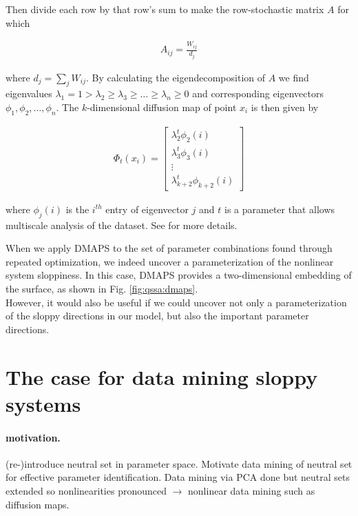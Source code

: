 \documentclass{article}
\begin{document}
Then divide each row by that row's sum to make the row-stochastic
matrix $A$ for which

\begin{align*}
  A_{ij} = \frac{W_{ij}}{d_j}
\end{align*}

where $d_j = \sum_j W_{ij}$. By calculating the eigendecomposition of
$A$ we find eigenvalues
$\lambda_1 = 1 > \lambda_2 \ge \lambda_3 \ge \hdots \ge \lambda_n \ge
0$ and corresponding eigenvectors $\phi_1, \phi_2, \hdots,
\phi_n$. The $k$-dimensional diffusion map of point $x_i$ is then
given by

\begin{align*}
  \Phi_t (x_i) = \begin{bmatrix} \lambda_2^t \phi_2(i) \\ \lambda_3^t
    \phi_3(i) \\ \vdots \\ \lambda_{k+2}^t \phi_{k+2}(i) \end{bmatrix}
\end{align*}

where $\phi_j(i)$ is the $i^{th}$ entry of eigenvector $j$ and $t$ is
a parameter that allows multiscale analysis of the dataset. See
\cite{dmaps} \cite{nadler} for more details.


When we apply DMAPS to the set of parameter combinations found through
repeated optimization, we indeed uncover a parameterization of the
nonlinear system sloppiness. In this case, DMAPS provides a
two-dimensional embedding of the surface, as shown in
Fig. \ref{fig:qssa:dmaps}. \\

However, it would also be useful if we could uncover not only a
parameterization of the sloppy directions in our model, but also the
important parameter directions.




\section{The case for data mining sloppy systems}

\paragraph{motivation.}
(re-)introduce neutral set in parameter space.  Motivate data mining
of neutral set for effective parameter identification.  Data mining
via PCA done \cite{ADS06} but neutral sets extended so nonlinearities
pronounced $\rightarrow$ nonlinear data mining such as diffusion
maps.
\end{document}

